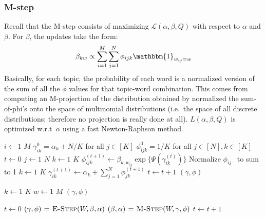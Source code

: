 \documentclass[10pt]{article}
\begin{document}
\subsubsection{M-step}
Recall that the M-step consists of maximizing $\mathcal{L}(\alpha, \beta, Q)$ with respect to $\alpha$ and $\beta$. For $\beta$, the updates take the form:
\begin{align}
    \beta_{kw} \propto \sum_{i=1}^M \sum_{j=1}^N \phi_{ijk}\mathbbm{1}_{w_{ij} = w}
\end{align}
Basically, for each topic, the probability of each word is a normalized version of the sum of all the $\phi$ values for that topic-word combination. This comes from computing an M-projection of the distribution obtained by normalized the sum-of-phi's onto the space of multinomial distributions (i.e.\ the space of all discrete distributions; therefore no projection is really done at all). $L(\alpha, \beta, Q)$ is optimized w.r.t\ $\alpha$ using a fast Newton-Raphson method.

\begin{codebox}
\li\For$i \gets 1$ \To$M$
\li    \Do$\gamma^0_{ik} = \alpha_k+ N/K$ for all $j \in[K]$
\li    $\phi^0_{ijk} = 1/K$ for all $j \in[N], k \in[K]$
\li    $t \gets 0$
\li    \While{}
\li        \Do\For$j \gets 1$ \To$N$
\li            \Do\For$k \gets 1$ \To$K$
\li                \Do$\phi^{(t+1)}_{ijk} \gets \beta_{k,w_{ij}} \exp\{\Psi(\gamma^{(t)}_{ik})\}$
                \End
\li            Normalize $\phi_{ij\cdot}$ to sum to 1
            \End
\li        \For$k \gets 1$ \To$K$
\li            \Do$\gamma^{(t+1)}_{ik} \gets \alpha_k+ \sum_{j=1}^N \phi^{(t+1)}_{jk}$
            \End
\li        $t \gets t + 1$
        \End
    \End
\li\Return$(\gamma, \phi)$
\end{codebox}

\begin{codebox}
\li\For$k \gets1$ \To$K$
\li     \Do \For $w \gets 1$ \To$M$
\li         \Do \For
        \End
    \End
\li\Return$(\gamma, \phi)$
\end{codebox}

\begin{codebox}
\li$t \gets0$
\li\While{}
\li    \Do$(\gamma, \phi) \mathrel{\hspace{1pt}=\hspace{1pt}} \textnormal{\scshape E-Step}(W, \beta, \alpha)$
\li    $(\beta, \alpha) \mathrel{\hspace{1pt}=\hspace{1pt}} \textnormal{\scshape M-Step}(W, \gamma, \phi)$
\li    $t \gets t + 1$
   \End
\end{codebox}
\end{document}
